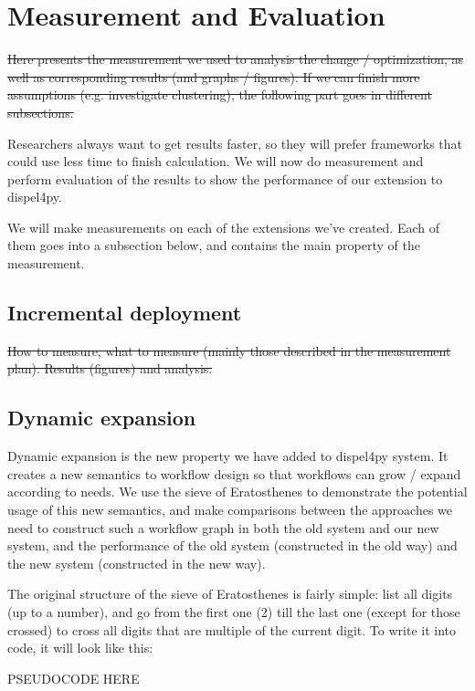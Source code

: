 \documentclass[•]{article}
\begin{document}
	\section{Measurement and Evaluation}
	\sout{Here presents the measurement we used to analysis the change / optimization, as well as corresponding results (and graphs / figures).
	If we can finish more assumptions (e.g. investigate clustering), the following part goes in different subsections.}
	
	Researchers always want to get results faster, so they will prefer frameworks that could use less time to finish calculation. We will now do measurement and perform evaluation of the results to show the performance of our extension to dispel4py.
	
	We will make measurements on each of the extensions we've created. Each of them goes into a subsection below, and contains the main property of the measurement.
	\subsection{Incremental deployment}
	\sout{How to measure, what to measure  (mainly those described in the measurement plan).
	Results (figures) and analysis.}
	
	\subsection{Dynamic expansion}
	Dynamic expansion is the new property we have added to dispel4py system. It creates a new semantics to workflow design so that workflows can grow / expand according to needs. We use the sieve of Eratosthenes to demonstrate the potential usage of this new semantics, and make comparisons between the approaches we need to construct such a workflow graph in both the old system and our new system, and the performance of the old system (constructed in the old way) and the new system (constructed in the new way).
	
	The original structure of the sieve of Eratosthenes is fairly simple: list all digits (up to a number), and go from the first one (2) till the last one (except for those crossed) to cross all digits that are multiple of the current digit. To write it into code, it will look like this:
	
	PSEUDOCODE HERE
	
\end{document}
